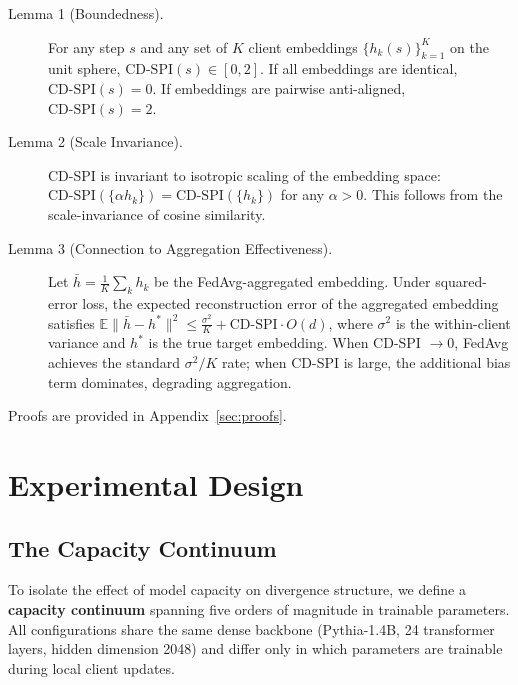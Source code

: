 \documentclass{article}
\begin{document}
\begin{description}
    \item[Lemma 1 (Boundedness).] For any step $s$ and any set of $K$ client embeddings $\{h_k(s)\}_{k=1}^K$ on the unit sphere, $\text{CD-SPI}(s) \in [0, 2]$. If all embeddings are identical, $\text{CD-SPI}(s) = 0$. If embeddings are pairwise anti-aligned, $\text{CD-SPI}(s) = 2$.

    \item[Lemma 2 (Scale Invariance).] CD-SPI is invariant to isotropic scaling of the embedding space: $\text{CD-SPI}(\{\alpha h_k\}) = \text{CD-SPI}(\{h_k\})$ for any $\alpha > 0$. This follows from the scale-invariance of cosine similarity.

    \item[Lemma 3 (Connection to Aggregation Effectiveness).]
    Let $\bar{h} = \frac{1}{K} \sum_k h_k$ be the FedAvg-aggregated embedding.
    Under squared-error loss, the expected reconstruction error of the aggregated embedding satisfies $\mathbb{E}\|\bar{h} - h^*\|^2 \leq \frac{\sigma^2}{K} + \text{CD-SPI} \cdot O(d)$, where $\sigma^2$ is the within-client variance and $h^*$ is the true target embedding.
    When CD-SPI $\to 0$, FedAvg achieves the standard $\sigma^2/K$ rate; when CD-SPI is large, the additional bias term dominates, degrading aggregation.
\end{description}

Proofs are provided in Appendix~\ref{sec:proofs}.

\section{Experimental Design}

\subsection{The Capacity Continuum}

To isolate the effect of model capacity on divergence structure, we define a \textbf{capacity continuum} spanning five orders of magnitude in trainable parameters.
All configurations share the same dense backbone (Pythia-1.4B, 24 transformer layers, hidden dimension 2048) and differ only in which parameters are trainable during local client updates.
\end{document}
